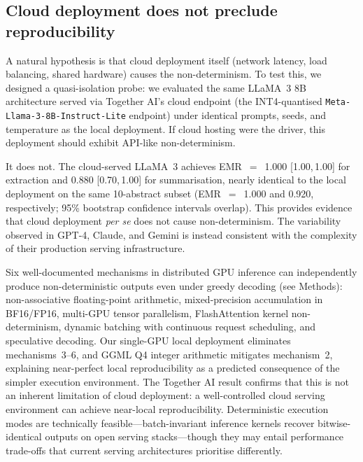 \documentclass[sn-nature]{sn-jnl}
\begin{document}
\subsection{Cloud deployment does not preclude reproducibility}\label{subsec:cloud}

A natural hypothesis is that cloud deployment itself (network latency, load balancing, shared hardware) causes the non-determinism.
To test this, we designed a quasi-isolation probe: we evaluated the same LLaMA~3 8B architecture served via Together AI's cloud endpoint (the INT4-quantised \texttt{Meta-Llama-3-8B-Instruct-Lite} endpoint) under identical prompts, seeds, and temperature as the local deployment.
If cloud hosting were the driver, this deployment should exhibit API-like non-determinism.

It does not.
The cloud-served LLaMA~3 achieves EMR~$=$~1.000 [1.00,\,1.00] for extraction and 0.880 [0.70,\,1.00] for summarisation, nearly identical to the local deployment on the same 10-abstract subset (EMR~$=$~1.000 and 0.920, respectively; 95\% bootstrap confidence intervals overlap).
This provides evidence that cloud deployment \emph{per se} does not cause non-determinism. The variability observed in GPT-4, Claude, and Gemini is instead consistent with the complexity of their production serving infrastructure.

Six well-documented mechanisms in distributed GPU inference can independently produce non-deterministic outputs even under greedy decoding (see Methods): non-associative floating-point arithmetic\cite{higham2002accuracy}, mixed-precision accumulation in BF16/FP16\cite{yuan2025nondeterminism}, multi-GPU tensor parallelism\cite{shoeybi2019megatron}, FlashAttention kernel non-determinism\cite{dao2022flashattention}, dynamic batching with continuous request scheduling\cite{kwon2023vllm}, and speculative decoding\cite{leviathan2023speculative}.
Our single-GPU local deployment eliminates mechanisms~3--6, and GGML Q4 integer arithmetic mitigates mechanism~2, explaining near-perfect local reproducibility as a predicted consequence of the simpler execution environment.
The Together AI result confirms that this is not an inherent limitation of cloud deployment: a well-controlled cloud serving environment can achieve near-local reproducibility.
Deterministic execution modes are technically feasible---batch-invariant inference kernels recover bitwise-identical outputs on open serving stacks\cite{he2025nondeterminism}---though they may entail performance trade-offs that current serving architectures prioritise differently.
\end{document}
